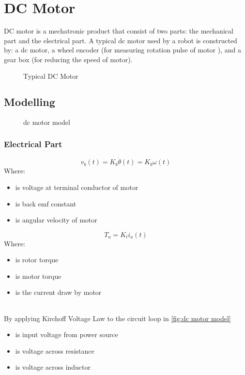\chapter{DC Motor}
DC motor is a mechatronic product that consist of two parts: the mechanical part and the electrical part. A typical dc motor used by a robot is constructed by: a dc motor, a wheel encoder (for measuring rotation pulse of motor ), and a gear box (for reducing the speed of motor).


\begin{figure}[ht]
	\centering
	
	\caption{Typical DC Motor}
	\label{fig:dcmotor}
\end{figure}

\section{Modelling}

\begin{figure}[ht]
	\centering
	
	\caption{dc motor model}
	\label{fig:dc motor model}
\end{figure}

\subsection{Electrical Part}
\begin{equation}
	v_b(t) = K_b \dot{\theta}(t) = K_b \omega(t)
	\label{dcmotoreq1}
\end{equation}
Where:
\begin{itemize}
	\item { is voltage at terminal conductor of motor }
	\item { is back emf constant}
	\item {\makebox[1cm]{\(\dot{\theta} = \omega\)\hfill} is angular velocity of motor}
\end{itemize}

\begin{equation}
	T_a = K_t i_a(t)
	\label{dcmotoreq2}
\end{equation}
Where:
\begin{itemize}
	\item { is rotor torque }
	\item { is motor torque}
	\item { is the current draw by motor}
\end{itemize}
\hfill\\
By applying Kirchoff Voltage Law to the circuit loop in \autoref{fig:dc motor model}
\begin{itemize}
	\item { is input voltage from power source}
	\item { is voltage across resistance}
	\item { is voltage across inductor}
\end{itemize}

